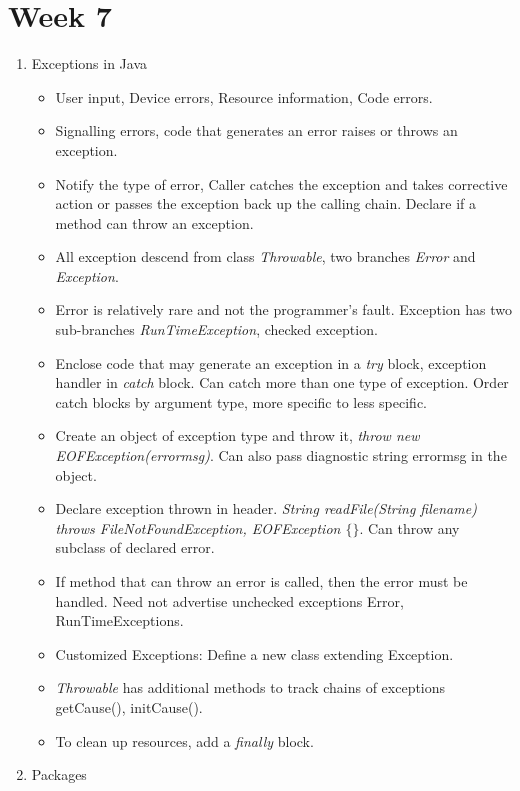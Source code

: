 \documentclass[a4paper]{article}
\begin{document}
\section{Week 7}
\begin{enumerate}
    \item Exceptions in Java
    \begin{itemize}
        \item User input, Device errors, Resource information, Code errors.
        \item Signalling errors, code that generates an error raises or throws an exception.
        \item Notify the type of error, Caller catches the exception and takes corrective action or passes the exception back up the calling chain. Declare if a method can throw an exception.
        \item All exception descend from class \textit{Throwable}, two branches \textit{Error} and \textit{Exception}.
        \item Error is relatively rare and not the programmer's fault. Exception has two sub-branches \textit{RunTimeException}, checked exception.
        \item Enclose code that may generate an exception in a \textit{try} block, exception handler in \textit{catch} block. Can catch more than one type of exception. Order catch blocks by argument type, more specific to less specific.
        \item Create an object of exception type and throw it, \textit{throw new EOFException(errormsg)}. Can also pass diagnostic string errormsg in the object.
        \item Declare exception thrown in header. \textit{String readFile(String filename) throws FileNotFoundException, EOFException $\{\}$}. Can throw any subclass of declared error.
        \item If method that can throw an error is called, then the error must be handled. Need not advertise unchecked exceptions Error, RunTimeExceptions.
        \item Customized Exceptions: Define a new class extending Exception.
        \item \textit{Throwable} has additional methods to track chains of exceptions getCause(), initCause().
        \item To clean up resources, add a \textit{finally} block.
    \end{itemize}
    \item Packages
    \begin{itemize}

\end{itemize}
\end{enumerate}
\end{document}
